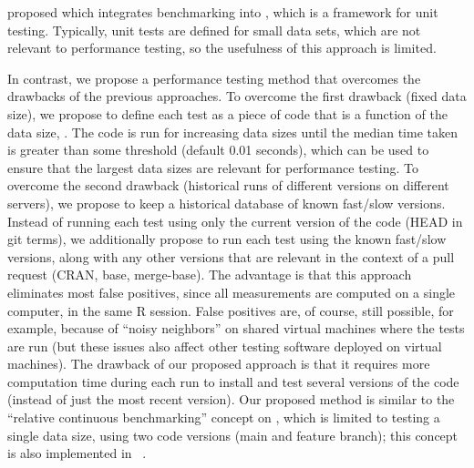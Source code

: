 \citet{pytest_benchmark} proposed  which integrates  benchmarking into , which is a framework for unit testing.
Typically, unit tests are defined for small data sets, which are not relevant to performance testing, so the usefulness of this approach is limited.

In contrast, we propose a performance testing method that overcomes the drawbacks of the previous approaches.
To overcome the first drawback (fixed data size), we propose to define each test as a piece of code that is a function of the data size, . 
The code is run for increasing data sizes until the median time taken is greater than some threshold (default 0.01 seconds), which can be used to ensure that the largest data sizes are relevant for performance testing.
To overcome the second drawback (historical runs of different versions on different servers), we propose to keep a historical database of known fast/slow versions.
Instead of running each test using only the current version of the code (HEAD in git terms), we additionally propose to run each test using the known fast/slow versions, along with any other versions that are relevant in the context of a pull request (CRAN, base, merge-base).
The advantage is that this approach eliminates most false positives, since all measurements are computed on a single computer, in the same R session.
False positives are, of course, still possible, for example, because of ``noisy neighbors'' on shared virtual machines where the tests are run (but these issues also affect other testing software deployed on virtual machines).
The drawback of our proposed approach is that it requires more computation time during each run to install and test several versions of the code (instead of just the most recent version).
Our proposed method is similar to the ``relative continuous benchmarking'' concept on  \citep{bencher}, which is limited to testing a single data size, using two code versions (main and feature branch); this concept is also implemented in 
~\citep{touchstone}.

